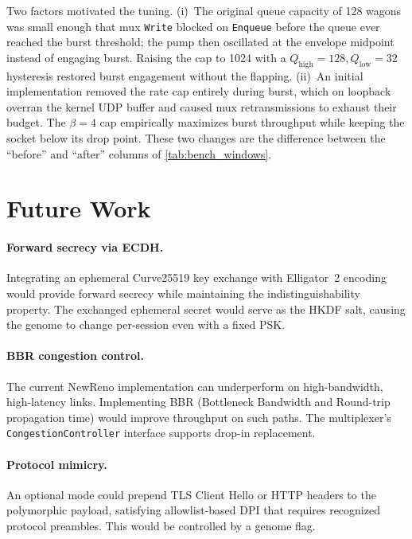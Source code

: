 \documentclass[11pt,a4paper]{article}
\let\oldparagraph\paragraph
\renewcommand{\paragraph}[1]{\needspace{5\baselineskip}\oldparagraph{#1}}
\begin{document}
Two factors motivated the tuning. (i)~The original queue capacity of 128 wagons was small enough that mux \texttt{Write} blocked on \texttt{Enqueue} before the queue ever reached the burst threshold; the pump then oscillated at the envelope midpoint instead of engaging burst. Raising the cap to 1024 with a $Q_{\text{high}}=128, Q_{\text{low}}=32$ hysteresis restored burst engagement without the flapping. (ii)~An initial implementation removed the rate cap entirely during burst, which on loopback overran the kernel UDP buffer and caused mux retransmissions to exhaust their budget. The $\beta = 4$ cap empirically maximizes burst throughput while keeping the socket below its drop point. These two changes are the difference between the ``before'' and ``after'' columns of \cref{tab:bench_windows}.

\section{Future Work}\label{sec:future}

\paragraph{Forward secrecy via ECDH.} Integrating an ephemeral Curve25519 key exchange with Elligator~2 encoding \cite{bernstein2006curve25519,bernstein2013elligator} would provide forward secrecy while maintaining the indistinguishability property. The exchanged ephemeral secret would serve as the HKDF salt, causing the genome to change per-session even with a fixed PSK.

\paragraph{BBR congestion control.} The current NewReno implementation can underperform on high-bandwidth, high-latency links. Implementing BBR (Bottleneck Bandwidth and Round-trip propagation time) would improve throughput on such paths. The multiplexer's \texttt{CongestionController} interface supports drop-in replacement.

\paragraph{Protocol mimicry.} An optional mode could prepend TLS Client Hello or HTTP headers to the polymorphic payload, satisfying allowlist-based DPI that requires recognized protocol preambles. This would be controlled by a genome flag.
\end{document}
